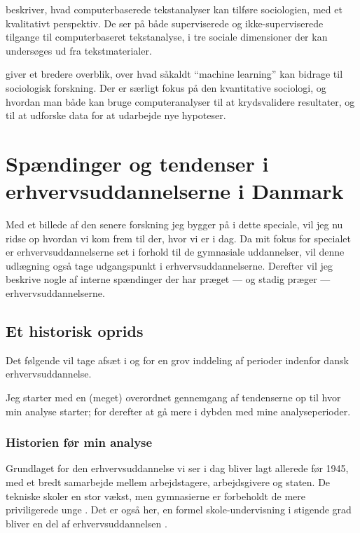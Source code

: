 \cite{evansMachineTranslationMining2016} beskriver, hvad computerbaserede tekstanalyser kan tilføre sociologien, med et kvalitativt perspektiv.
De ser på både superviserede og ikke-superviserede tilgange til computerbaseret tekstanalyse, i tre sociale dimensioner der kan undersøges ud fra tekstmaterialer.

 \cite{molinaMachineLearningSociology2019} giver et bredere overblik, over hvad såkaldt “machine learning” kan bidrage til sociologisk forskning.
Der er særligt fokus på den kvantitative sociologi, og hvordan man både kan bruge computeranalyser til at krydsvalidere resultater, og til at udforske data for at udarbejde nye hypoteser.

\chapter{Spændinger og tendenser i erhvervsuddannelserne i Danmark}
Med et billede af den senere forskning jeg bygger på i dette speciale, vil jeg nu ridse op hvordan vi kom frem til der, hvor vi er i dag.
Da mit fokus for specialet er erhvervsuddannelserne set i forhold til de gymnasiale uddannelser, vil denne udlægning også tage udgangspunkt i erhvervsuddannelserne.
Derefter vil jeg beskrive nogle af interne spændinger der har præget — og stadig præger — erhvervsuddannelserne.

\section{Et historisk oprids}

Det følgende vil tage afsæt i \cite{bondergaardHistoricalEmergenceKey2014} og \cite{juulDiskurserOmUngdom2013} for en grov inddeling af perioder indenfor dansk erhvervsuddannelse.

Jeg starter med en (meget) overordnet gennemgang af tendenserne op til hvor min analyse starter; for derefter at gå mere i dybden med mine analyseperioder.

\subsection{Historien før min analyse}

 Grundlaget for den erhvervsuddannelse vi ser i dag bliver lagt allerede før 1945, med et bredt samarbejde mellem arbejdstagere, arbejdsgivere og staten.
De tekniske skoler en stor vækst, men gymnasierne er forbeholdt de mere priviligerede unge \autocite[s. 9]{bondergaardHistoricalEmergenceKey2014}.
Det er også her, en formel skole-undervisning i stigende grad bliver en del af erhvervsuddannelsen \autocite[s. 15ff]{bondergaardHistoricalEmergenceKey2014}. 

